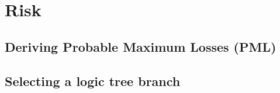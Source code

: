 \chapter{Risk}
\label{chap-risk}


	\section{Deriving Probable Maximum Losses (PML)}
	\label{sec:derive-pml}
	
	
	\section{Selecting a logic tree branch}
	\label{sec:logic-tree}
	